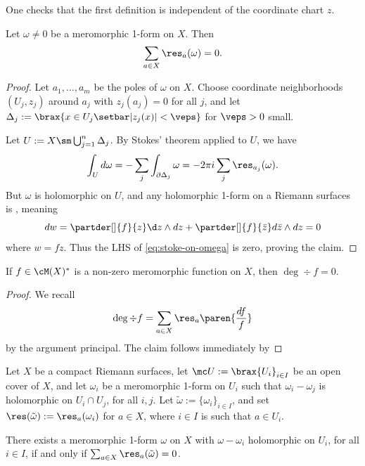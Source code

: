 \documentclass[11pt]{report}
\begin{document}
One checks that the first definition is independent of the coordinate chart $z$.

\begin{lem} \label{lem:sum-of-res-is-0}
Let $\omega \neq 0$ be a meromorphic 1-form on $X$. Then
\[
\sum_{a \in X}\res_a(\omega)=0.
\]
\end{lem}

\begin{proof}
Let $a_1,\dots,a_m$ be the poles of $\omega$ on $X$. Choose coordinate neighborhoods $(U_j,z_j)$ around $a_j$ with $z_j(a_j)=0$ for all $j$, and let $\Delta_j := \brax{x \in U_j \setbar |z_j(x)| < \veps }$ for $\veps >0$ small.
\begin{figure}[H]
	\centering
	\label{fig:sum-of-poles}
\end{figure}
Let $U := X \sm \bigcup _{j=1}^n\Delta_j$. By Stokes' theorem applied to $U$, we have
\begin{align} \label{eq:stoke-on-omega}
    \int_U d\omega = -\sum_{j}\int_{\partial \Delta_j}\omega = -2\pi i \sum_j \res_{a_j}(\omega).
\end{align}
But $\omega$ is holomorphic on $U$, and any holomorphic 1-form on a Riemann surfaces is , meaning
\[
dw = \partder[]{f}{z}\d z \land d z + \partder[]{f}{\bar z}d\bar z \land d z=0
\]
where $w = fz$. Thus the LHS of \eqref{eq:stoke-on-omega} is zero, proving the claim.
\end{proof}

\begin{cor}
If $f \in \cM(X)^*$ is a non-zero meromorphic function on $X$, then $\deg \div f =0$.
\end{cor}

\begin{proof}
We recall
\[
\deg \div f = \sum_{a \in X}\res_a \paren{\frac{df}{f}}
\]
by the argument principal. The claim follows immediately by 
\end{proof}

Let $X$ be a compact Riemann surfaces, let $\mc U := \brax{U_i}_{i \in I}$ be an open cover of $X$, and let $\omega _i$ be a meromorphic 1-form on $U_i$ such that $\omega_i -\omega_j$ is holomorphic on $U_i \cap U_j$, for all $i,j$. Let $\tilde \omega := \{\omega_i\}_{i \in I}$, and set $\res (\tilde \omega):=\res_a(\omega_i)$ for $a \in X$, where $i \in I$ is such that $a \in U_i$.

\begin{thm} \label{thm:mittag-leffler-forms}
There exists a meromorphic 1-form $\omega$ on $X$ with $\omega - \omega _i$ holomorphic on $U_i$, for all $i \in I$, if and only if $\sum_{a \in X} \res_a(\tilde \omega)=0$.
\end{thm}
\end{document}
